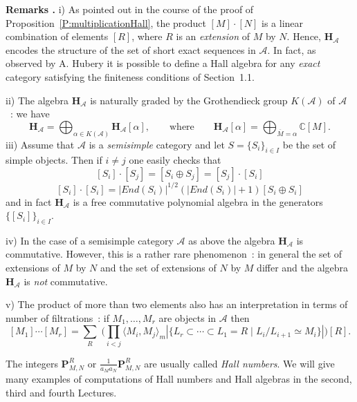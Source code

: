 \documentclass[a4paper,10pt]{amsart}
\def\H{\mathbf{H}}
\def\a{\alpha}
\def\C{\mathbb{C}}
\def\A{\mathcal{A}}
\numberwithin{equation}{section}
\begin{document}
\vspace{.15in}

\addtocounter{theo}{1}
\noindent \textbf{Remarks \thetheo .} i) As pointed out in the course of the proof of Proposition~\ref{P:multiplicationHall}, the product $[M] \cdot [N]$ is a linear combination of elements $[R]$, where $R$ is an \textit{extension} of $M$ by $N$. Hence, $\H_{\mathcal{A}}$ encodes the structure of the set of short exact sequences in $\mathcal{A}$. In fact, as observed by A. Hubery \cite{Hubery1} it is possible to define a Hall algebra for any \textit{exact} category satisfying the finiteness conditions of Section~1.1.

\vspace{.05in}

\noindent
ii) The algebra $\H_{\mathcal{A}}$ is naturally graded by the Grothendieck group $K(\mathcal{A})$ of $\mathcal{A}$~: we have
$$\H_{\mathcal{A}}=\bigoplus_{\a \in K(\mathcal{A})} \H_{\A}[\a], \qquad \text{where}\qquad
 \H_{\A}[\a]=\bigoplus_{\overline{M}=\a} \C[M].$$
iii) Assume that $\A$ is a \textit{semisimple} category and let $S=\{S_i\}_{i \in I}$ be the set of simple objects. Then if $i \neq j$ one easily checks that
$$[S_i] \cdot [S_j]=[S_i \oplus S_j]=[S_j] \cdot [S_i]$$
$$[S_i] \cdot [S_i]=|End(S_i)|^{1/2}(|{End}(S_i)| +1) [S_i \oplus S_i]$$
and in fact $\H_{\A}$ is a free commutative polynomial algebra in the generators $\{[S_i]\}_{i \in I}$.

\vspace{.05in}

\noindent
iv) In the case of a semisimple category $\mathcal{A}$ as above the algebra $\H_{\A}$ is commutative. However, this is a rather rare phenomenon~:  in general the set of extensions of $M$ by $N$ and the set of extensions of $N$ by $M$ differ and the algebra $\H_{\mathcal{A}}$ is \textit{not} commutative.

\vspace{.05in}

\noindent
v) The product of more than two elements also has an interpretation in terms of number of filtrations~: if $M_1, \ldots, M_r$ are objects in $\A$ then
$$[M_1] \cdots [M_r]=\sum_{R}\;\big( \prod_{i<j} \langle M_i,M_j \rangle_m \left|\big\{ L_r \subset \cdots \subset L_1=R\;|\; L_i/L_{i+1} \simeq M_i\big\}\right| \big)[R].$$

\vspace{.1in}

The integers $\mathbf{P}_{M,N}^R$ or $\frac{1}{a_Ma_N}\mathbf{P}_{M,N}^R$ are usually called \textit{Hall numbers}. We will give many examples of computations of Hall numbers and Hall algebras in the second, third and fourth Lectures.
\end{document}

